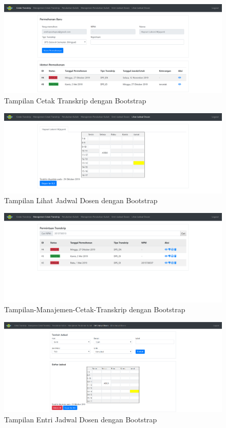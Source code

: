 \documentclass[a4paper,twoside]{article}
\begin{document}
\begin{enumerate}
		\begin{figure}[ht!]
			\includegraphics [scale=0.5] {Tampilan-Cetak-Transkrip_Bootstrap.PNG}
			\caption{Tampilan Cetak Transkrip dengan Bootstrap}
		\end{figure}
		
		\begin{figure}[h]
			\includegraphics [scale=0.5] {Tampilan-Lihat-Jadwal-Dosen_Bootstrap.PNG}
			\caption{Tampilan Lihat Jadwal Dosen dengan Bootstrap}
		\end{figure}
		
		\begin{figure}[ht!]
			\includegraphics [scale=0.5] {Tampilan-Manajemen-Cetak-Transkrip_Bootstrap.PNG}
			\caption{Tampilan-Manajemen-Cetak-Transkrip dengan Bootstrap}
		\end{figure}
		
		\begin{figure}[ht!]
			\includegraphics [scale=0.5] {Tampilan-Entri-Jadwal-Dosen_Bootstrap.PNG}
			\caption{Tampilan Entri Jadwal Dosen dengan Bootstrap}
		\end{figure}
		

\end{enumerate}
\end{document}
